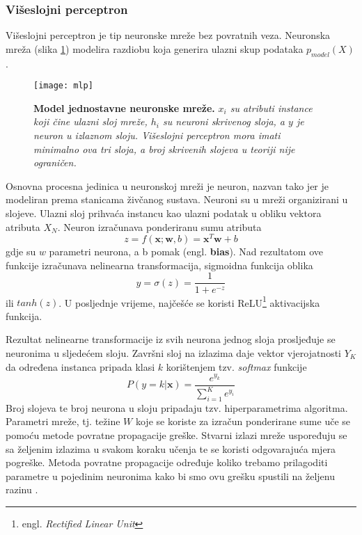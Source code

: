 \subsubsection{Višeslojni perceptron}
Višeslojni perceptron je tip neuronske mreže bez povratnih veza. Neuronska mreža (slika \ref{fig:mlp}) modelira razdiobu koja generira ulazni skup podataka $p_{model}(X)$.
\begin{figure}[!ht]
    \centering
    \texttt{[image: mlp]}
    \caption[Model jednostavne neuronske mreže]{\textbf{Model jednostavne neuronske mreže.} \textit{$x_i$ su atributi instance koji čine ulazni sloj mreže, $h_i$ su neuroni skrivenog sloja, a $y$ je neuron u izlaznom sloju. Višeslojni perceptron mora imati minimalno ova tri sloja, a broj skrivenih slojeva u teoriji nije ograničen.}}
    \label{fig:mlp}
\end{figure}

Osnovna procesna jedinica u neuronskoj mreži je neuron, nazvan tako jer je modeliran prema stanicama živčanog sustava. Neuroni su u mreži organizirani u slojeve. Ulazni sloj prihvaća instancu kao ulazni podatak u obliku vektora atributa $X_N$. Neuron izračunava ponderiranu sumu atributa
\begin{equation}
    z = f(\textbf{x};\textbf{w},b) = \textbf{x}^T\textbf{w} + b
\end{equation}
gdje su $w$ parametri neurona, a b pomak (engl. \textbf{bias}). 
Nad rezultatom ove funkcije izračunava nelinearna transformacija, sigmoidna funkcija oblika
\begin{equation}
    y = \sigma(z) = \frac{1}{1+e^{-z}}
\end{equation}
ili $tanh(z)$. U posljednje vrijeme, najčešće se koristi ReLU\footnote{engl. \textit{Rectified Linear Unit}} aktivacijska funkcija.

Rezultat nelinearne transformacije iz svih neurona jednog sloja prosljeđuje se neuronima u sljedećem sloju. Završni sloj na izlazima daje vektor vjerojatnosti $Y_K$ da određena instanca pripada klasi $k$ korištenjem tzv. \textit{softmax} funkcije
\begin{equation}
    P(y=k|\textbf{x}) = \frac{e^{y_k}}{\sum_{i=1}^{K}e^{y_i}}
\end{equation}
Broj slojeva te broj neurona u sloju pripadaju tzv. hiperparametrima algoritma. Parametri mreže, tj. težine $W$ koje se koriste za izračun ponderirane sume uče se pomoću metode povratne propagacije greške. Stvarni izlazi mreže uspoređuju se sa željenim izlazima u svakom koraku učenja te se koristi odgovarajuća mjera pogreške. Metoda povratne propagacije određuje koliko trebamo prilagoditi parametre u pojedinim neuronima kako bi smo ovu grešku spustili na željenu razinu \cite{Goodfellow01}.

